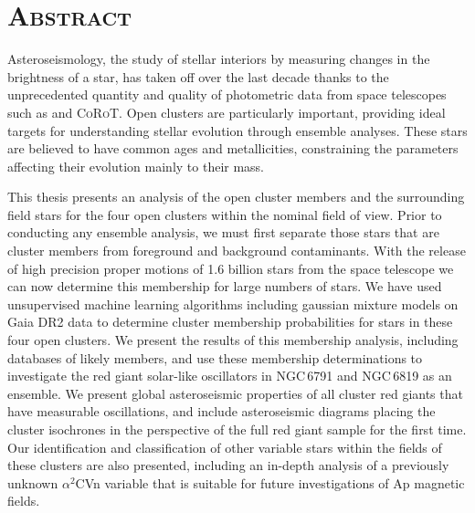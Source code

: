 \chapter*{\textsc{Abstract}}

\vspace{1.5cm}

Asteroseismology, the study of stellar interiors by measuring changes in the brightness of a star, has taken off over the last decade thanks to the unprecedented quantity and quality of photometric data from space telescopes such as \Kepler{} and \textsc{CoRoT}. Open clusters are particularly important, providing ideal targets for understanding stellar evolution through ensemble analyses. These stars are believed to have common ages and metallicities, constraining the parameters affecting their evolution mainly to their mass. 

This thesis presents an analysis of the open cluster members and the surrounding field stars for the four open clusters within the nominal \Kepler{} field of view. %
Prior to conducting any ensemble analysis, we must first separate those stars that are cluster members from foreground and background contaminants. With the release of high precision proper motions of 1.6 billion stars from the \Gaia{} space telescope we can now determine this membership for large numbers of stars. We have used unsupervised machine learning algorithms including gaussian mixture models on Gaia DR2 data to determine cluster membership probabilities for stars in these four open clusters. We present the results of this membership analysis, including databases of likely members, and use these membership determinations to investigate the red giant solar-like oscillators in NGC\,6791 and NGC\,6819 as an ensemble. We present global asteroseismic properties of all cluster red giants that have measurable oscillations, and include asteroseismic diagrams placing the cluster isochrones in the perspective of the full \Kepler{} red giant sample for the first time. Our identification and classification of other variable stars within the fields of these clusters are also presented, including an in-depth analysis of a previously unknown $\alpha^2$CVn variable that is suitable for future investigations of Ap magnetic fields.